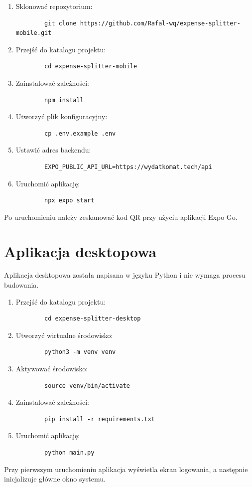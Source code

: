 \begin{enumerate}
	\item Sklonować repozytorium:
	\begin{verbatim}
		git clone https://github.com/Rafal-wq/expense-splitter-mobile.git
	\end{verbatim}
	\item Przejść do katalogu projektu:
	\begin{verbatim}
		cd expense-splitter-mobile
	\end{verbatim}
	\item Zainstalować zależności:
	\begin{verbatim}
		npm install
	\end{verbatim}
	\item Utworzyć plik konfiguracyjny:
	\begin{verbatim}
		cp .env.example .env
	\end{verbatim}
	\item Ustawić adres backendu:
	\begin{verbatim}
		EXPO_PUBLIC_API_URL=https://wydatkomat.tech/api
	\end{verbatim}
	\item Uruchomić aplikację:
	\begin{verbatim}
		npx expo start
	\end{verbatim}
\end{enumerate}

Po uruchomieniu należy zeskanować kod QR przy użyciu aplikacji Expo Go.

\section{Aplikacja desktopowa}

Aplikacja desktopowa została napisana w języku Python i nie wymaga procesu budowania.

\begin{enumerate}
	\item Przejść do katalogu projektu:
	\begin{verbatim}
		cd expense-splitter-desktop
	\end{verbatim}
	\item Utworzyć wirtualne środowisko:
	\begin{verbatim}
		python3 -m venv venv
	\end{verbatim}
	\item Aktywować środowisko:
	\begin{verbatim}
		source venv/bin/activate
	\end{verbatim}
	\item Zainstalować zależności:
	\begin{verbatim}
		pip install -r requirements.txt
	\end{verbatim}
	\item Uruchomić aplikację:
	\begin{verbatim}
		python main.py
	\end{verbatim}
\end{enumerate}

Przy pierwszym uruchomieniu aplikacja wyświetla ekran logowania, a następnie inicjalizuje główne okno systemu.